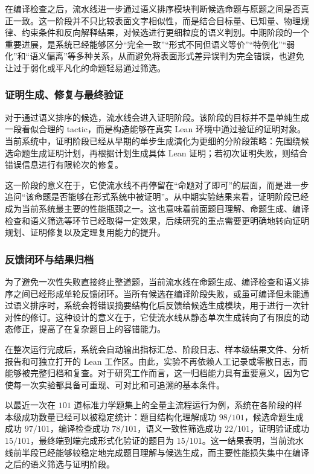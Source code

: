 \documentclass[12pt,a4paper]{ctexart}
\begin{document}
在编译检查之后，流水线进一步通过语义排序模块判断候选命题与原题之间是否真正一致。这一阶段并不只比较表面文字相似性，而是结合目标量、已知量、物理规律、约束条件和反向解释结果，对候选进行更细粒度的语义判别。中期阶段的一个重要进展，是系统已经能够区分“完全一致”“形式不同但语义等价”“特例化”“弱化”和“语义偏离”等多种关系，从而避免将表面形式差异误判为完全错误，也避免让过于弱化或平凡化的命题轻易通过筛选。

\subsubsection{证明生成、修复与最终验证}

对于通过语义排序的候选，流水线会进入证明阶段。该阶段的目标并不是单纯生成一段看似合理的 tactic，而是构造能够在真实 Lean 环境中通过验证的证明对象。当前系统中，证明阶段已经从早期的单步生成演化为更细的分阶段策略：先围绕候选命题生成证明计划，再根据计划生成具体 Lean 证明；若初次证明失败，则结合错误信息进行有限轮次的修复。

这一阶段的意义在于，它使流水线不再停留在“命题对了即可”的层面，而是进一步追问“该命题是否能够在形式系统中被证明”。从中期实验结果来看，证明阶段已经成为当前系统最主要的性能瓶颈之一。这也意味着前面题目理解、命题生成、编译检查和语义筛选等环节已经取得一定效果，后续研究的重点需要更明确地转向证明规划、证明修复以及定理复用能力的提升。

\subsubsection{反馈闭环与结果归档}

为了避免一次性失败直接终止整道题，当前流水线在命题生成、编译检查和语义排序之间已经形成单轮反馈闭环。当所有候选在编译阶段失败，或虽可编译但未能通过语义排序时，系统会将错误摘要结构化后反馈给候选生成模块，用于进行一次针对性的修订。这种设计的意义在于，它使流水线从静态单次生成转向了有限度的动态修正，提高了在复杂题目上的容错能力。

在整次运行完成后，系统会自动输出指标汇总、阶段日志、样本级结果文件、分析报告和可独立打开的 Lean 工作区。由此，实验不再依赖人工记录或零散日志，而能够被完整归档和复查。对于研究工作而言，这一归档能力具有重要意义，因为它使每一次实验都具备可重现、可对比和可追溯的基本条件。

以最近一次在 $101$ 道标准力学题集上的全量主流程运行为例，系统在各阶段的样本级成功数量已经可以被稳定统计：题目结构化理解成功 $98/101$，候选命题生成成功 $97/101$，编译检查成功 $78/101$，语义一致性筛选成功 $22/101$，证明验证成功 $15/101$，最终端到端完成形式化验证的题目为 $15/101$。这一结果表明，当前流水线前半段已经能够较稳定地完成题目理解与候选生成，而主要性能损失集中在编译之后的语义筛选与证明阶段。
\end{document}
